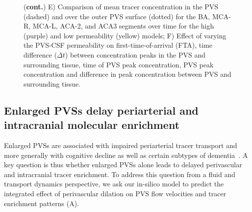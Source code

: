 \documentclass[fleqn,10pt]{wlscirep}
\newcommand{\mer}[1]{\textcolor{magenta}{#1}}
\begin{document}
\begin{figure}
\ContinuedFloat
\caption{(\textbf{cont.})
  E) Comparison of mean tracer concentration in the PVS (dashed) and over the
outer PVS surface (dotted) for the BA, MCA-R, MCA-L, ACA-2, and ACA3 segments over time for the high (purple) and low permeability (yellow) models;
  F) Effect of varying the PVS-CSF permeability on first-time-of-arrival (FTA), time difference ($\Delta t$) between concentration peaks in the PVS and surrounding tissue, time of PVS peak concentration, PVS peak concentration and difference in peak concentration between PVS and surrounding tissue.}
\end{figure}
  
\subsection*{Enlarged PVSs delay periarterial and intracranial molecular enrichment}

Enlarged PVSs are associated with impaired periarterial tracer
transport and more generally with cognitive decline as well as
certain subtypes of
dementia~\cite{bown2022physiology,eide2024functional}. A key
question is thus whether enlarged PVSs alone leads to delayed perivascular
and intracranial tracer enrichment. To address this question from a
fluid and transport dynamics perspective, we ask our in-silico model
to predict the integrated effect of perivascular dilation on PVS flow
velocities and tracer enrichment patterns (A).
\end{document}

